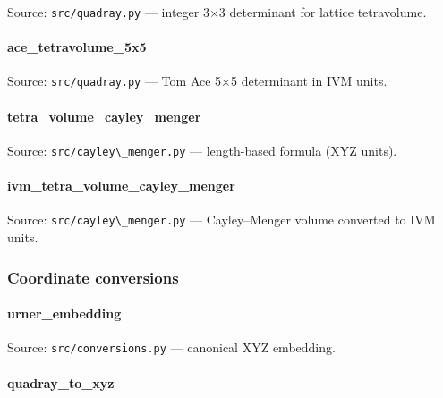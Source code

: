 \documentclass[
  10pt,
]{article}
\newcommand{\passthrough}[1]{#1}
\renewcommand{\texttt}[1]{%
    \colorbox{codebg}{\color{codefg}\ttfamily #1}%
}
\begin{document}
Source: \passthrough{\lstinline!src/quadray.py!} --- integer 3×3
determinant for lattice tetravolume.

\hypertarget{code:ace_tetravolume_5x5}{%
\paragraph{\texorpdfstring{\texttt{ace\_tetravolume\_5x5}}{ace\_tetravolume\_5x5}}\label{code:ace_tetravolume_5x5}}

Source: \passthrough{\lstinline!src/quadray.py!} --- Tom Ace 5×5
determinant in IVM units.

\hypertarget{code:tetra_volume_cayley_menger}{%
\paragraph{\texorpdfstring{\texttt{tetra\_volume\_cayley\_menger}}{tetra\_volume\_cayley\_menger}}\label{code:tetra_volume_cayley_menger}}

Source: \passthrough{\lstinline!src/cayley\_menger.py!} --- length-based
formula (XYZ units).

\hypertarget{code:ivm_tetra_volume_cayley_menger}{%
\paragraph{\texorpdfstring{\texttt{ivm\_tetra\_volume\_cayley\_menger}}{ivm\_tetra\_volume\_cayley\_menger}}\label{code:ivm_tetra_volume_cayley_menger}}

Source: \passthrough{\lstinline!src/cayley\_menger.py!} ---
Cayley--Menger volume converted to IVM units.

\hypertarget{code:coordinate_conversions}{%
\subsubsection{Coordinate
conversions}\label{code:coordinate_conversions}}

\hypertarget{code:urner_embedding}{%
\paragraph{\texorpdfstring{\texttt{urner\_embedding}}{urner\_embedding}}\label{code:urner_embedding}}

Source: \passthrough{\lstinline!src/conversions.py!} --- canonical XYZ
embedding.

\hypertarget{code:quadray_to_xyz}{%
\paragraph{\texorpdfstring{\texttt{quadray\_to\_xyz}}{quadray\_to\_xyz}}\label{code:quadray_to_xyz}}
\end{document}
